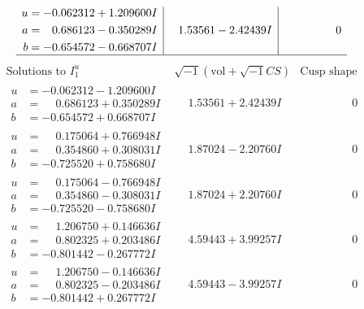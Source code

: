 \documentclass[1p]{elsarticle_modified}
\theoremstyle{definition}
\newcommand{\I}{\sqrt{-1}}
\begin{document}
$$\begin{array}{c|c|c}
\begin{aligned}
u &= -0.062312 + 1.209600 I \\
a &= \phantom{-}0.686123 - 0.350289 I \\
b &= -0.654572 - 0.668707 I\end{aligned}
 & \phantom{-}1.53561 - 2.42439 I & \phantom{-0.000000 } 0\\
 \hline 
 \end{array}$$\newpage$$\begin{array}{c|c|c}  
\text{Solutions to }I^u_{1}& \I (\text{vol} + \sqrt{-1}CS) & \text{Cusp shape}\\
 \hline 
\begin{aligned}
u &= -0.062312 - 1.209600 I \\
a &= \phantom{-}0.686123 + 0.350289 I \\
b &= -0.654572 + 0.668707 I\end{aligned}
 & \phantom{-}1.53561 + 2.42439 I & \phantom{-0.000000 } 0 \\ \hline\begin{aligned}
u &= \phantom{-}0.175064 + 0.766948 I \\
a &= \phantom{-}0.354860 + 0.308031 I \\
b &= -0.725520 + 0.758680 I\end{aligned}
 & \phantom{-}1.87024 - 2.20760 I & \phantom{-0.000000 } 0 \\ \hline\begin{aligned}
u &= \phantom{-}0.175064 - 0.766948 I \\
a &= \phantom{-}0.354860 - 0.308031 I \\
b &= -0.725520 - 0.758680 I\end{aligned}
 & \phantom{-}1.87024 + 2.20760 I & \phantom{-0.000000 } 0 \\ \hline\begin{aligned}
u &= \phantom{-}1.206750 + 0.146636 I \\
a &= \phantom{-}0.802325 + 0.203486 I \\
b &= -0.801442 - 0.267772 I\end{aligned}
 & \phantom{-}4.59443 + 3.99257 I & \phantom{-0.000000 } 0 \\ \hline\begin{aligned}
u &= \phantom{-}1.206750 - 0.146636 I \\
a &= \phantom{-}0.802325 - 0.203486 I \\
b &= -0.801442 + 0.267772 I\end{aligned}
 & \phantom{-}4.59443 - 3.99257 I & \phantom{-0.000000 } 0 \\ \hline\begin{aligned}

\end{aligned}
\end{array}$$
\end{document}
